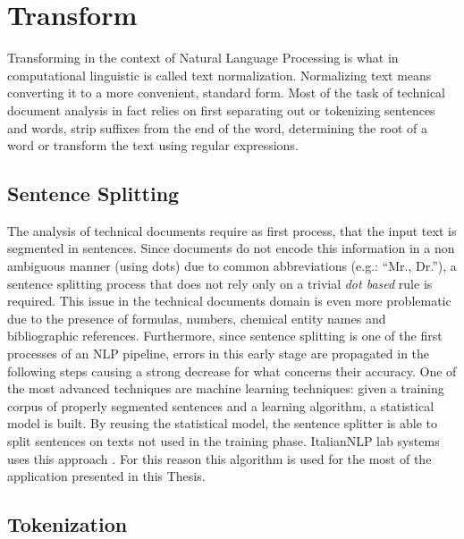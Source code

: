 \documentclass[]{book}
\begin{document}
\section{Transform}\label{sotatoolstransform}

Transforming in the context of Natural Language Processing is what in
computational linguistic is called text normalization. Normalizing text
means converting it to a more convenient, standard form. Most of the
task of technical document analysis in fact relies on first separating
out or tokenizing sentences and words, strip suffixes from the end of
the word, determining the root of a word or transform the text using
regular expressions.

\subsection{Sentence Splitting}\label{sotatoolstransformsentencesplit}

The analysis of technical documents require as first process, that the
input text is segmented in sentences. Since documents do not encode this
information in a non ambiguous manner (using dots) due to common
abbreviations (e.g.: ``Mr., Dr.''), a sentence splitting process that
does not rely only on a trivial \emph{dot based} rule is required. This
issue in the technical documents domain is even more problematic due to
the presence of formulas, numbers, chemical entity names and
bibliographic references. Furthermore, since sentence splitting is one
of the first processes of an NLP pipeline, errors in this early stage
are propagated in the following steps causing a strong decrease for what
concerns their accuracy. One of the most advanced techniques are machine
learning techniques: given a training corpus of properly segmented
sentences and a learning algorithm, a statistical model is built. By
reusing the statistical model, the sentence splitter is able to split
sentences on texts not used in the training phase. ItalianNLP lab
systems uses this approach
\citep{dell2009ensemble, attardi2009reverse, attardi2009accurate}. For
this reason this algorithm is used for the most of the application
presented in this Thesis.

\subsection{Tokenization}\label{tokenization}
\end{document}
